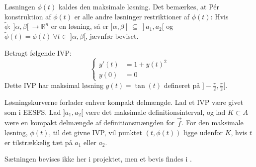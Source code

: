 Løsningen $\phi(t)$ kaldes den maksimale løsning. Det bemærkes, at Pér konstruktion af $\phi(t)$ er alle andre løsninger restriktioner af $\phi(t)$: Hvis $\tilde{\phi}\colon\ ]\alpha,\beta[ \ \to \mathbb{R}^n$ er en løsning, så er $]\alpha,\beta[ \ \subseteq \ ]a_1,a_2[$ og $\tilde{\phi}(t)=\phi(t) \ \forall t\in \ ]\alpha,\beta[$, jævnfør beviset.
\begin{Example}
\textnormal{\hfill \break Betragt følgende IVP:}
$$\begin{cases}
      y'(t)&=1+y(t)^2\\
      y(0)&=0
    \end{cases}$$
\textnormal{Dette IVP har maksimal løsning $y(t)=\tan(t)$ defineret på $]-\frac{\pi}{2},\frac{\pi}{2}[$.}
\end{Example}
\begin{mytheo}{Løsningskurverne forlader enhver kompakt delmængde. \citep[Sætning 3 s. 42]{Svensk}}{}\label{forladkompakt}
Lad et IVP være givet som i EESFS. Lad $]a_1,a_2[$ være det maksimale definitionsinterval, og lad $K\subset A$ være en kompakt delmængde af definitionsmængden for $\vec{f}$. For den maksimale løsning, $\phi(t)$, til det givne IVP, vil punktet $(t,\phi(t))$ ligge udenfor $K$, hvis $t$ er tilstrækkelig tæt på $a_1$ eller $a_2$.
\end{mytheo}
Sætningen bevises ikke her i projektet, men et bevis findes i \citep[s. 43-44]{Svensk}. \\ \hfill \break
